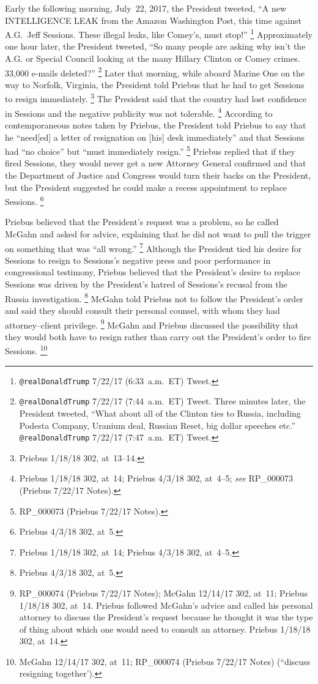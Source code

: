 Early the following morning, July~22, 2017, the President tweeted, ``A new INTELLIGENCE LEAK from the Amazon Washington Post, this time against A.G.~Jeff Sessions.
These illegal leaks, like Comey's, must stop!''%
\footnote{\verb+@realDonaldTrump+ 7/22/17 (6:33~a.m.~ET) Tweet.}
Approximately one hour later, the President tweeted, ``So many people are asking why isn't the A.G. or Special Council looking at the many Hillary Clinton or Comey crimes.
33,000 e-mails deleted?''%
\footnote{\verb+@realDonaldTrump+ 7/22/17 (7:44~a.m.~ET) Tweet.
Three minutes later, the President tweeted, ``What about all of the Clinton ties to Russia, including Podesta Company, Uranium deal, Russian Reset, big dollar speeches etc.''
\verb+@realDonaldTrump+ 7/22/17 (7:47~a.m.~ET) Tweet.}
Later that morning, while aboard Marine One on the way to Norfolk, Virginia, the President told Priebus that he had to get Sessions to resign immediately.%
\footnote{Priebus 1/18/18 302, at~13--14.}
The President said that the country had lost confidence in Sessions and the negative publicity was not tolerable.%
\footnote{Priebus 1/18/18 302, at~14;
Priebus 4/3/18 302, at~4--5;
\textit{see} RP\_000073 (Priebus 7/22/17 Notes).}
According to contemporaneous notes taken by Priebus, the President told Priebus to say that he ``need[ed] a letter of resignation on [his] desk immediately'' and that Sessions had ``no choice'' but ``must immediately resign.''%
\footnote{RP\_000073 (Priebus 7/22/17 Notes).}
Priebus replied that if they fired Sessions, they would never get a new Attorney General confirmed and that the Department of Justice and Congress would turn their backs on the President, but the President suggested he could make a recess appointment to replace Sessions.%
\footnote{Priebus 4/3/18 302, at~5.}

Priebus believed that the President's request was a problem, so he called McGahn and asked for advice, explaining that he did not want to pull the trigger on something that was ``all wrong.''%
\footnote{Priebus 1/18/18 302, at~14;
Priebus 4/3/18 302, at~4--5.}
Although the President tied his desire for Sessions to resign to Sessions's negative press and poor performance in congressional testimony, Priebus believed that the President's desire to replace Sessions was driven by the President's hatred of Sessions's recusal from the Russia investigation.%
\footnote{Priebus 4/3/18 302, at~5.}
McGahn told Priebus not to follow the President's order and said they should consult their personal counsel, with whom they had attorney--client privilege.%
\footnote{RP\_000074 (Priebus 7/22/17 Notes);
McGahn 12/14/17 302, at~11;
Priebus 1/18/18 302, at~14.
Priebus followed McGahn's advice and called his personal attorney to discuss the President's request because he thought it was the type of thing about which one would need to consult an attorney.
Priebus 1/18/18 302, at~14.}
McGahn and Priebus discussed the possibility that they would both have to resign rather than carry out the President's order to fire Sessions.%
\footnote{McGahn 12/14/17 302, at~11;
RP\_000074 (Priebus 7/22/17 Notes) (``discuss resigning together').}

